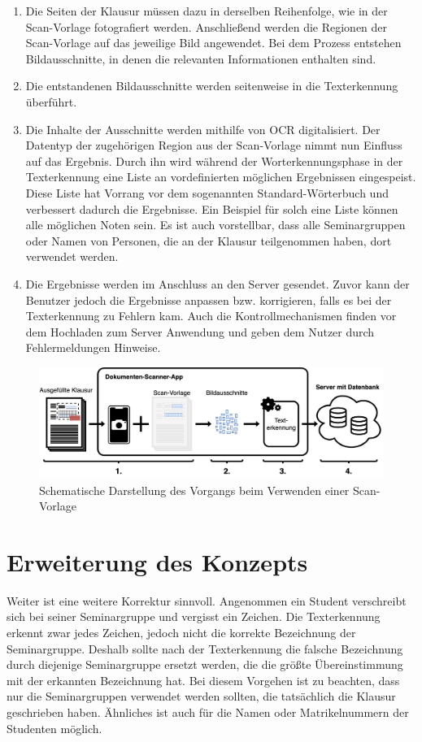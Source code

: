 \documentclass[notables, nomenclature, oneside, 150]{HSMW-Thesis}
\begin{document}
		\begin{enumerate}
			\item Die Seiten der Klausur müssen dazu in derselben Reihenfolge, wie in der Scan-Vorlage fotografiert werden. Anschließend werden die Regionen der Scan-Vorlage auf das jeweilige Bild angewendet. Bei dem Prozess entstehen Bildausschnitte, in denen die relevanten Informationen enthalten sind.
			\item Die entstandenen Bildausschnitte werden seitenweise in die Texterkennung überführt.
			\item \label{it:ocr} Die Inhalte der Ausschnitte werden mithilfe von OCR digitalisiert. Der Datentyp der zugehörigen Region aus der Scan-Vorlage nimmt nun Einfluss auf das Ergebnis. Durch ihn wird während der Worterkennungsphase in der Texterkennung eine Liste an vordefinierten möglichen Ergebnissen eingespeist. Diese Liste hat Vorrang vor dem sogenannten Standard-Wörterbuch und verbessert dadurch die Ergebnisse. Ein Beispiel für solch eine Liste können alle möglichen Noten sein. Es ist auch vorstellbar, dass alle Seminargruppen oder Namen von Personen, die an der Klausur teilgenommen haben, dort verwendet werden.
			\item Die Ergebnisse werden im Anschluss an den Server gesendet. Zuvor kann der Benutzer jedoch die Ergebnisse anpassen bzw. korrigieren, falls es bei der Texterkennung zu Fehlern kam. Auch die Kontrollmechanismen finden vor dem Hochladen zum Server Anwendung und geben dem Nutzer durch Fehlermeldungen Hinweise. \label{it:senden}
		\end{enumerate}

		\begin{figure}[h!]
    		\centering
    		\includegraphics[width=\textwidth]{img/schema2}
    		\caption{Schematische Darstellung des Vorgangs beim Verwenden einer Scan-Vorlage}
    		\label{fig:schema2}
    	\end{figure}
		
	\section{Erweiterung des Konzepts}\label{sc:erweiterungkonzept}
		Weiter ist eine weitere Korrektur sinnvoll. Angenommen ein Student verschreibt sich bei seiner Seminargruppe und vergisst ein Zeichen. Die Texterkennung erkennt zwar jedes Zeichen, jedoch nicht die korrekte Bezeichnung der Seminargruppe. Deshalb sollte nach der Texterkennung die falsche Bezeichnung durch diejenige Seminargruppe ersetzt werden, die die größte Übereinstimmung mit der erkannten Bezeichnung hat. Bei diesem Vorgehen ist zu beachten, dass nur die Seminargruppen verwendet werden sollten, die tatsächlich die Klausur geschrieben haben. Ähnliches ist auch für die Namen oder Matrikelnummern der Studenten möglich.
		
\end{document}
